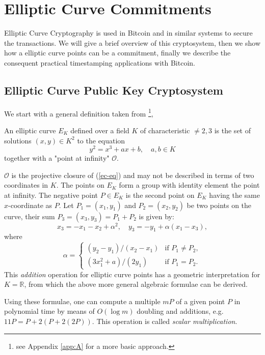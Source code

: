 \chapter{Elliptic Curve Commitments}
\label{chpr:ec-commitments}
Elliptic Curve Cryptography is used in Bitcoin and in similar systems to secure the transactions. 
We will give a brief overview of this cryptosystem, then we show how a elliptic curve points can be a commitment, finally we describe the consequent practical timestamping applications with Bitcoin.  

\section{Elliptic Curve Public Key Cryptosystem}
We start with a general definition taken from \cite{Koblitz1987}\footnote{see Appendix \ref{app:A} for a more basic approach.},
\begin{mydef}
	An elliptic curve $E_K$ defined over a field $K$ of characteristic $\neq 2, 3$ is the set of solutions $(x,y)\in K^2$ to the equation
	\begin{equation}
	\label{ec-eq}
	y^2 = x^3 + ax + b, \quad a,b \in K
	\end{equation}
	together with a "point at infinity" $\mathcal{O}$.
\end{mydef}
$\mathcal{O}$ is the projective closure of (\ref{ec-eq}) and may not be described in terms of two coordinates in $K$.
The points on $E_K$ form a group with identity element the point at infinity. The negative point $P \in E_K$ is the second point on $E_K$ having the same $x$-coordinate as $P$. Let $P_1=(x_1,y_1)$ and $P_2=(x_2,y_2)$ be two points on the curve, their sum $P_3=(x_3,y_3) = P_1 + P_2$ is given by:
\begin{equation}
x_3 = -x_1 -x_2 + \alpha^2, \quad 
y_3 = -y_1 + \alpha(x_1 - x_3),
\end{equation}
where
\begin{equation}
\alpha = \begin{cases}
			(y_2 - y_1)/(x_2 - x_1) & \textrm{if } P_1 \neq P_2, \\
			(3x_1^2 + a)/(2y_1) & \textrm{if } P_1 = P_2.
\end{cases}
\end{equation}
This \textit{addition} operation for elliptic curve points has a geometric interpretation for $K = \mathbb{R}$, from which the above more general algebraic formulae can be derived.

Using these formulae, one can compute a multiple $mP$ of a given point $P$ in polynomial time by means of $O(\log m)$ doubling and additions, e.g. $11P = P + 2(P + 2(2P))$. This operation is called \textit{scalar multiplication}.

